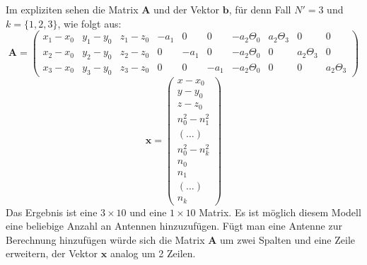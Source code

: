 {%
Im expliziten sehen die Matrix $\mathbf{A}$ und der Vektor $\mathbf{b}$, für denn Fall $N'=3$ und $k=\{1,2,3\}$, wie folgt aus:
%
\begin{equation}
\mathbf{A}=
\left(
	\begin{array}{cccccccccc}
		x_1-x_0 & y_1-y_0 & z_1-z_0 & -a_1 & 0 & 0 & -a_2\Theta_0 & a_2\Theta_3 & 0 & 0 \\
		x_2-x_0 & y_2-y_0 & z_2-z_0 & 0 & -a_1 & 0 & -a_2\Theta_0& 0 & a_2\Theta_3 & 0 \\
		x_3-x_0 & y_3-y_0 & z_3-z_0 & 0 & 0 & -a_1 & -a_2\Theta_0& 0 & 0 & a_2\Theta_3
	\end{array}
\right)
\end{equation}
%
\begin{equation}
\mathbf{x}=
\left(
	\begin{array}{c}
		x-x_0	\\
		y-y_0	\\
		z-z_0	\\
		n_0^2-n_1^2	\\
		(\dots)	\\
		n_0^2-n_k^2	\\
		n_0 \\
		n_1	\\
		(\dots)	\\
		n_k	
	\end{array}
\right)
\end{equation}
Das Ergebnis ist eine $3\times10$ und eine $1\times10$ Matrix. Es ist möglich diesem Modell eine beliebige Anzahl an Antennen hinzuzufügen. Fügt man eine Antenne zur Berechnung hinzufügen würde sich die Matrix $\mathbf{A}$ um zwei Spalten und eine Zeile erweitern, der Vektor $\mathbf{x}$ analog um 2 Zeilen.

}